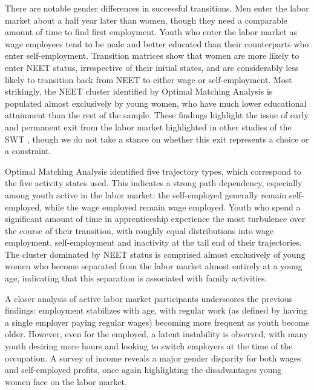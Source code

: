 \documentclass[
  a4paper, twoside, 12pt]{book}
\begin{document}
There are notable gender differences in successful transitions. Men enter the labor market about a half year later than women, though they need a comparable amount of time to find first employment. Youth who enter the labor market as wage employees tend to be male and better educated than their counterparts who enter self-employment. Transition matrices show that women are more likely to enter NEET status, irrespective of their initial states, and are considerably less likely to transition back from NEET to either wage or self-employment. Most strikingly, the NEET cluster identified by Optimal Matching Analysis is populated almost exclusively by young women, who have much lower educational attainment than the rest of the sample. These findings highlight the issue of early and permanent exit from the labor market highlighted in other studies of the SWT \autocite{manacorda2017,dedehouanou2019}, though we do not take a stance on whether this exit represents a choice or a constraint.

Optimal Matching Analysis identified five trajectory types, which correspond to the five activity states used. This indicates a strong path dependency, especially among youth active in the labor market: the self-employed generally remain self-employed, while the wage employed remain wage employed. Youth who spend a significant amount of time in apprenticeship experience the most turbulence over the course of their transition, with roughly equal distributions into wage employment, self-employment and inactivity at the tail end of their trajectories. The cluster dominated by NEET status is comprised almost exclusively of young women who become separated from the labor market almost entirely at a young age, indicating that this separation is associated with family activities.

A closer analysis of active labor market participants underscores the previous findings: employment stabilizes with age, with regular work (as defined by having a single employer paying regular wages) becoming more frequent as youth become older. However, even for the employed, a latent instability is observed, with many youth desiring more hours and looking to switch employers at the time of the occupation. A survey of income reveals a major gender disparity for both wages and self-employed profits, once again highlighting the disadvantages young women face on the labor market.
\end{document}
